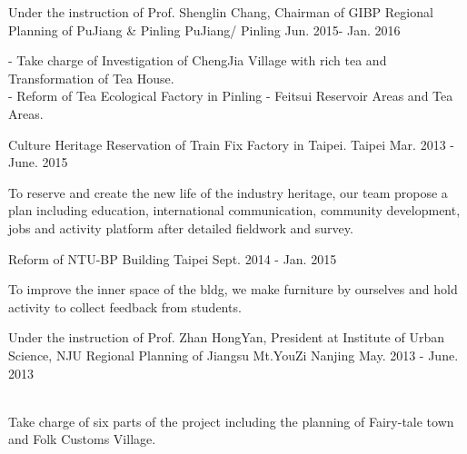 \begin{cventries}
  \cventry   
    {Under the instruction of Prof. Shenglin Chang, Chairman of GIBP}
    {Regional Planning of PuJiang \& Pinling  }
    {PuJiang/ Pinling}
    {Jun. 2015- Jan. 2016}    
    {
      \begin{cvitems}
      	\item{
        - Take charge of Investigation of ChengJia Village with rich tea and Transformation of Tea House.  \\
        - Reform of Tea Ecological Factory in Pinling - Feitsui Reservoir Areas and Tea Areas.
        }
      \end{cvitems}
      }
      
  \cventry   
    {}
    {Culture Heritage Reservation of Train Fix Factory in Taipei.}
    {Taipei}
    {Mar. 2013 - June. 2015}    
    {
      \begin{cvitems}
        \item{ 
        To reserve and create the new life of the industry heritage, our team propose a plan including education, international communication, community development, jobs and activity platform after detailed fieldwork and survey.}
      \end{cvitems}
    }
    
    \cventry   
    {}
    {Reform of NTU-BP Building}
    {Taipei}
    {Sept. 2014 - Jan. 2015}    
    {
      \begin{cvitems}
        \item{
        To improve the inner space of the bldg, we make furniture by ourselves and hold activity to collect feedback from students.
        }
      \end{cvitems}
    }
    
    
    
    
        \cventry   
    {Under the instruction of Prof. Zhan HongYan, President at Institute of Urban Science, NJU}
    {Regional Planning of Jiangsu Mt.YouZi}
    {Nanjing}
    {May. 2013 - June. 2013}    
    {
      \begin{cvitems}
        \item{\textbf{}\\
         Take charge of six parts of the project including the planning of Fairy-tale town and Folk Customs Village.
        }
      \end{cvitems}
    }
    
    
    

\end{cventries}
